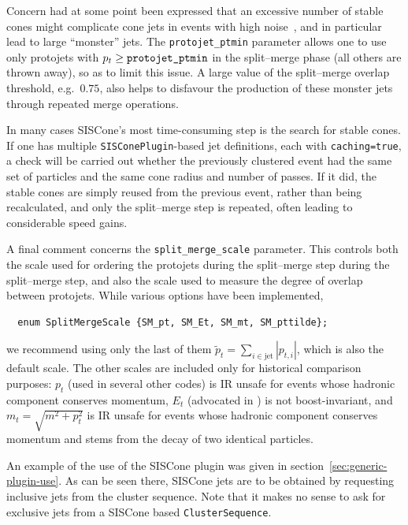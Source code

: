 \documentclass[12pt,a4]{article}
\begin{document}
Concern had at some point been expressed that an excessive number of
stable cones might complicate cone jets in events with high
noise~\cite{RunII-jet-physics}, and in particular lead to large
``monster'' jets.
%
The \verb:protojet_ptmin: parameter allows one to use only protojets
with $p_t \ge \verb:protojet_ptmin:$ in the split--merge phase (all
others are thrown away), so as to limit this issue.
%
A large value of the split--merge overlap threshold, e.g.\ $0.75$,
also helps to disfavour the production of these monster jets through
repeated merge operations.

In many cases SISCone's most time-consuming step is the search for
stable cones. If one has multiple \verb:SISConePlugin:-based jet
definitions, each with \verb:caching=true:, a check will be carried
out whether the previously clustered event had the same set of
particles and the same cone radius and number of passes. If it did,
the stable cones are simply reused from the previous event, rather
than being recalculated, and only the split--merge step is repeated,
often leading to considerable speed gains.

A final comment concerns the \verb:split_merge_scale:
parameter. This controls both the scale used for ordering the
protojets during the split--merge step during the split--merge step,
and also the scale used to measure the degree of overlap between
protojets. While various options have been implemented, 
\begin{lstlisting}
  enum SplitMergeScale {SM_pt, SM_Et, SM_mt, SM_pttilde};
\end{lstlisting}
we recommend using only the last of them $\tilde p_t = \sum_{i \in
  \mathrm{jet}}|p_{t,i}|$, which is also the default scale. The other
scales are included only for historical comparison purposes: $p_t$
(used in several other codes) is IR unsafe for events whose hadronic
component conserves momentum, $E_t$ (advocated in
\cite{RunII-jet-physics}) is not boost-invariant, and $m_t = \sqrt{m^2
  + p_t^2}$ is IR unsafe for events whose hadronic component conserves
momentum and stems from the decay of two identical particles.


An example of the use of the SISCone plugin was given in
section~\ref{sec:generic-plugin-use}. 
%
As can be seen there, SISCone jets are to be obtained by requesting
inclusive jets from the cluster sequence.
%
Note that it makes no sense to ask for exclusive jets from a
SISCone based \verb:ClusterSequence:.
\end{document}
